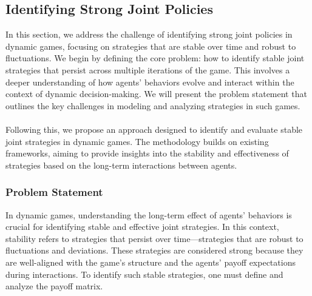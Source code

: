 \subsection{Identifying Strong Joint Policies}

\begin{flushleft}

    In this section, we address the challenge of identifying strong joint policies in dynamic games, focusing on strategies that are stable over time and robust to fluctuations. We begin by defining the core problem: how to identify stable joint strategies that persist across multiple iterations of the game. This involves a deeper understanding of how agents’ behaviors evolve and interact within the context of dynamic decision-making. We will present the problem statement that outlines the key challenges in modeling and analyzing strategies in such games.\\~\\

    Following this, we propose an approach designed to identify and evaluate stable joint strategies in dynamic games. The methodology builds on existing frameworks, aiming to provide insights into the stability and effectiveness of strategies based on the long-term interactions between agents.

    \subsubsection{Problem Statement}

    \begin{flushleft}

        In dynamic games, understanding the long-term effect of agents' behaviors is crucial for identifying stable and effective joint strategies. In this context, stability refers to strategies that persist over time—strategies that are robust to fluctuations and deviations. These strategies are considered strong because they are well-aligned with the game’s structure and the agents' payoff expectations during interactions. To identify such stable strategies, one must define and analyze the payoff matrix.\\~\\
        

\end{flushleft}
\end{flushleft}
